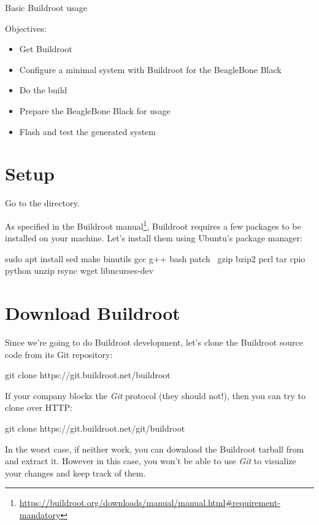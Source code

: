\subchapter
{Basic Buildroot usage}
{Objectives:
  \begin{itemize}
  \item Get Buildroot
  \item Configure a minimal system with Buildroot for the BeagleBone
    Black
  \item Do the build
  \item Prepare the BeagleBone Black for usage
  \item Flash and test the generated system
  \end{itemize}
}

\section{Setup}

Go to the  directory.

As specified in the Buildroot
manual\footnote{\url{https://buildroot.org/downloads/manual/manual.html\#requirement-mandatory}},
Buildroot requires a few packages to be installed on your
machine. Let's install them using Ubuntu's package manager:

\begin{bashinput}
sudo apt install sed make binutils gcc g++ bash patch \
  gzip bzip2 perl tar cpio python unzip rsync wget libncurses-dev
\end{bashinput}

\section{Download Buildroot}

Since we're going to do Buildroot development, let's clone the
Buildroot source code from its Git repository:

\begin{bashinput}
git clone https://git.buildroot.net/buildroot
\end{bashinput}

If your company blocks the {\em Git} protocol (they should not!), then
you can try to clone over HTTP:

\begin{bashinput}
git clone https://git.buildroot.net/git/buildroot
\end{bashinput}

In the worst case, if neither work, you can download the Buildroot
tarball \code{buildroot-2021.02.tar.bz2} from
 and extract it. However in this
case, you won't be able to use {\em Git} to visualize your changes and
keep track of them.


